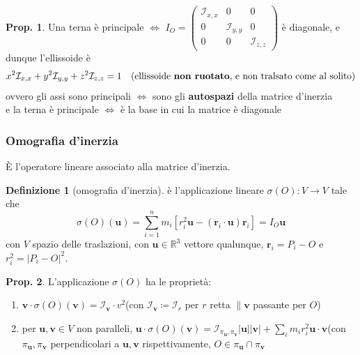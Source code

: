 \documentclass[a4paper,10pt]{article}
\theoremstyle{definition}
\newcommand{\bv}{\boldsymbol} %
\newcommand{\re}{\mathbb{R}} %
\theoremstyle{indentdefinition}
\newtheorem{defn}{Definizione}[section]
\theoremstyle{indenttheorem}
\newtheorem{prop}{Prop.}
\theoremstyle{myremark}
\theoremstyle{indentgeneral}
\begin{document}
\begin{prop}
Una terna è principale $\Longleftrightarrow$ $I_{O}=\begin{pmatrix}\mathcal{I}_{x,x} & 0 & 0\\
0 & \mathcal{I}_{y,y} & 0\\
0 & 0 & \mathcal{I}_{z,z}
\end{pmatrix}$ è diagonale, e dunque l'ellissoide è $$x^{2}\mathcal{I}_{x,x}+y^{2}\mathcal{I}_{y,y}+z^{2}\mathcal{I}_{z,z}=1\quad \text{(ellissoide \textbf{non ruotato}, e non tralsato come al solito)}$$
ovvero gli assi sono principali $\iff$ sono gli \textbf{autospazi} della matrice d'inerzia \\
e la terna è principale $\iff$ è la base in cui la matrice è diagonale
\end{prop}



\subsubsection{Omografia d'inerzia}
È l'operatore lineare associato alla matrice d'inerzia.
\begin{defn}[omografia d'inerzia]
\label{def:omografia-inerzia}è l'applicazione lineare $\sigma\left(O\right)\colon V\rightarrow V$
tale che $$\sigma\left(O\right)\left(\boldsymbol{u}\right)=\sum_{i=1}^{n}m_{i}\left[r_{i}^{2}\boldsymbol{u}-\left(\boldsymbol{r}_{i}\cdot\boldsymbol{u}\right)\boldsymbol{r}_{i}\right]=I_O\bv{u}$$
con $V$ spazio delle traslazioni, con $\bv{u}\in\re^3$ vettore qualunque, $\boldsymbol{r}_{i}=P_{i}-O$
e $r_{i}^{2}=\left|P_{i}-O\right|^{2}$. \\
\end{defn}

\begin{prop}
 L'applicazione $\sigma\left(O\right)$ ha le proprietà:
\end{prop}

\begin{enumerate}
\item $\boldsymbol{v}\cdot\sigma\left(O\right)\left(\boldsymbol{v}\right)=\mathcal{I}_{\boldsymbol{v}}\cdot v^{2}$\qquad{}(con
$\mathcal{I}_{\boldsymbol{v}}\coloneqq\mathcal{I}_{r}$ per $r$ retta
$\parallel\boldsymbol{v}$ passante per $O$)
\item per $\boldsymbol{u},\boldsymbol{v}\in V$ non paralleli, $\boldsymbol{u}\cdot\sigma\left(O\right)\left(\boldsymbol{v}\right)=\mathcal{I}_{\pi_{\boldsymbol{u}},\pi_{\boldsymbol{v}}}\left|\boldsymbol{u}\right|\left|\boldsymbol{v}\right|+\sum_{i}m_{i}r_{i}^{2}\boldsymbol{u}\cdot\boldsymbol{v}$\qquad{}(con
$\pi_{\boldsymbol{u}},\pi_{\boldsymbol{v}}$ perpendicolari a $\boldsymbol{u},\boldsymbol{v}$
rispettivamente, $O\in\pi_{\boldsymbol{u}}\cap\pi_{\boldsymbol{v}}$
\end{enumerate}
\end{document}
